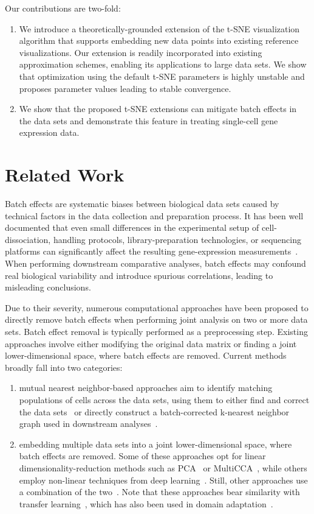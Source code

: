 \documentclass[runningheads]{llncs}
\begin{document}
Our contributions are two-fold: 
\begin{enumerate}
  \item We introduce a theoretically-grounded extension of the t-SNE
   visualization algorithm that supports embedding new data points into
   existing reference visualizations. Our extension is readily incorporated
   into existing approximation schemes, enabling its applications to large
   data sets. We show that optimization using the default t-SNE parameters is
   highly unstable and proposes parameter values leading to stable
   convergence.

  \item We show that the proposed t-SNE extensions can mitigate batch effects
   in the data sets and demonstrate this feature in treating single-cell gene
   expression data.
\end{enumerate}


\section{Related Work}

Batch effects are systematic biases between biological data sets caused by
technical factors in the data collection and preparation process. It has been
well documented that even small differences in the experimental setup of
cell-dissociation, handling protocols, library-preparation technologies, or
sequencing platforms can significantly affect the resulting gene-expression
measurements~\cite{Tung2017,Hicks2018}. When performing downstream
comparative analyses, batch effects may confound real biological variability
and introduce spurious correlations, leading to misleading conclusions.

Due to their severity, numerous computational approaches have been proposed to
directly remove batch effects when performing joint analysis on two or more
data sets. Batch effect removal is typically performed as a preprocessing
step. Existing approaches involve either modifying the original data matrix
or finding a joint lower-dimensional space, where batch effects are removed.
Current methods broadly fall into two categories:
\begin{enumerate}
\item mutual nearest neighbor-based approaches aim to identify matching
 populations of cells across the data sets, using them to either find and correct the data sets~\cite{Haghverdi2018} or directly construct a
 batch-corrected k-nearest neighbor graph used in downstream analyses~\cite{Park2018}.
\item embedding multiple data sets into a joint lower-dimensional space, where
 batch effects are removed. Some of these approaches opt for linear
 dimensionality-reduction methods such as PCA~\cite{Korsunsky2019} or
 MultiCCA~\cite{Butler2018}, while others employ non-linear techniques from
 deep learning~\cite{Li2020,Lopez2018}. Still, other approaches use a
 combination of the two~\cite{Stuart2019,Hie2019}. Note that these approaches bear similarity with transfer learning~\cite{weiss2016survey}, which has also been used in domain adaptation~\cite{liu2019jointly}.
\end{enumerate}
\end{document}
